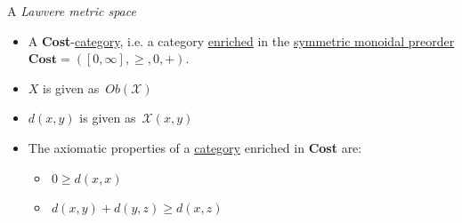A \emph{Lawvere metric space}

\begin{itemize}
    \item  A \textbf{Cost}-\href{doc/1 math/Seven Sketches in Compositionality/Chapter 2: Resource theories/3 Enrichment/1 V-categories/1 V-category}{category}, i.e. a category \href{doc/1 math/Seven Sketches in Compositionality/Chapter 2: Resource theories/3 Enrichment/1 V-categories/1 V-category}{enriched} in the \href{doc/1 math/Seven Sketches in Compositionality/Chapter 2: Resource theories/2 Symmetric monoidal preorders/1 Definition and first examples/1 Symmetric monoidal structure on a preorder}{symmetric monoidal preorder} $\mathbf{Cost}=([0,\infty],\geq,0,+)$.
    \item $X$ is given as \,$Ob(\mathcal{X})$\,
    \item $d(x,y)$ is given as \,$\mathcal{X}(x,y)$\,
    \item The axiomatic properties of a \href{doc/1 math/Seven Sketches in Compositionality/Chapter 2: Resource theories/3 Enrichment/1 V-categories/1 V-category}{category} enriched in \textbf{Cost} are:
          \begin{itemize}
            \item \,$0 \geq d(x,x)$\,
            \item \,$d(x,y)+d(y,z) \geq d(x,z)$\,
          \end{itemize}
  \end{itemize}
